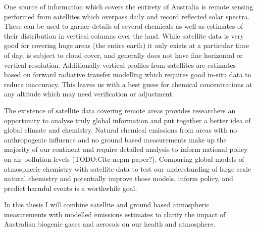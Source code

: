 One source of information which covers the entirety of Australia is remote sensing performed from satellites which overpass daily and record reflected solar spectra.
These can be used to garner details of several chemicals as well as estimates of their distribution in vertical columns over the land.
While satellite data is very good for covering huge areas (the entire earth) it only exists at a particular time of day, is subject to cloud cover, and generally does not have fine horizontal or vertical resolution.
Additionally vertical profiles from satellites are estimates based on forward radiative transfer modelling which requires good in-situ data to reduce inaccuracy.
This leaves us with a best guess for chemical concentrations at any altitude which may need verification or adjustment.

The existence of satellite data covering remote areas provides researchers an opportunity to analyse truly global information and put together a better idea of global climate and chemistry.
Natural chemical emissions from areas with no anthropogenic influence and no ground based measurements make up the majority of our continent \cite{VanDerA_2008} and require detailed analysis to inform national policy on air pollution levels (TODO:Cite nepm paper?).   
Comparing global models of atmospheric chemistry with satellite data to test our understanding of large scale natural chemistry and potentially improve those models, inform policy, and predict harmful events is a worthwhile goal.

In this thesis I will combine satellite and ground based atmospheric measurements with modelled emissions estimates to clarify the impact of Australian biogenic gases and aerosols on our health and atmosphere.
